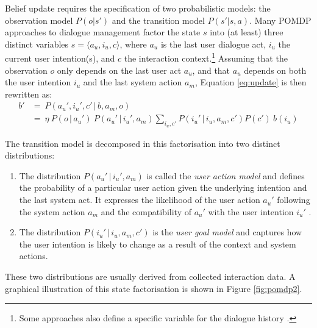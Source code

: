 Belief update requires the specification of two probabilistic models: the observation model $P(o|s')$ and the transition model $P(s'|s,a)$. Many POMDP approaches to dialogue management factor the state $s$ into (at least) three distinct variables $s = \langle a_u, i_u, c \rangle$, where $a_u$ is the last user dialogue act, $i_u$ the current user intention(s), and $c$ the interaction context.\footnote{Some approaches also define a specific variable for the dialogue history \citep{Young:2010}.}   Assuming that the observation $o$ only depends on the last user act $a_u$, and that $a_u$ depends on both the user intention $i_u$ and the last system action $a_m$, Equation \eqref{eq:update} is then rewritten as:
\begin{align}
b' & = \ P(a_u', i_u', c' \, | \, b, a_m,o)\\
& = \ \eta \ P(o \, | \, a_u') \ P(a_u' \, | \, i_u', a_m) \sum_{i_u, c'} P(i_u' \, | \, i_u,a_m, c') P(c') \ b(i_u) \label{eq:update2}
\end{align}

The transition model is decomposed in this factorisation into two distinct distributions: \begin{enumerate}
\item  The distribution $P(a_u' \, | \, i_u', a_m)$ is called the \textit{user action model} and defines the probability of a particular user action given the underlying intention and the last system act.  It expresses the likelihood of the user action $a_u'$ following the system action $a_m$ and the compatibility of $a_u'$ with the user intention $i_u'$ \citep{Young:2010}.
\item The distribution $P(i_u' \, | \, i_u, a_m, c')$ is the \textit{user goal model} and captures how the user intention is likely to change as a result of the context and system actions.  
\end{enumerate}

These two distributions are usually derived from collected interaction data. A graphical illustration of this state factorisation is shown in Figure \ref{fig:pomdp2}. 

